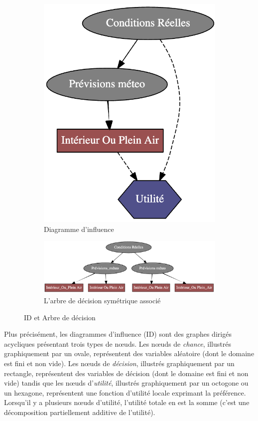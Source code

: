 \documentclass[12pt]{article}
\begin{document}
\begin{figure}[h]
\centering
\begin{subfigure}{.5\textwidth}
  \centering
  \includegraphics[width=.5\linewidth]{docs/ressources_rapport/exempleID_SIMPLE.png}
  \caption{Diagramme d'influence}
  \label{fig:sub1}
\end{subfigure}%
\begin{subfigure}{.5\textwidth}
  \centering
  \includegraphics[width=1.2\linewidth]{docs/ressources_rapport/exempleArbreDecision.png}
  \caption{L'arbre de décision symétrique associé}
  \label{fig:sub2}
\end{subfigure}
\caption{ID et Arbre de décision}
\label{fig:test}
\end{figure}

Plus précisément, les diagrammes d'influence (ID) sont des graphes dirigés acycliques présentant trois types de nœuds. Les nœuds de \textit{chance}, illustrés graphiquement par un ovale, représentent des variables aléatoire (dont le domaine est fini et non vide). 
Les nœuds de \textit{décision}, illustrés graphiquement par un rectangle, représentent des variables de décision (dont le domaine est fini et non vide) tandis que les nœuds d'\textit{utilité}, illustrés graphiquement par un octogone ou un hexagone, représentent une fonction d'utilité locale exprimant la préférence.
Lorsqu'il y a plusieurs nœuds d'utilité, l'utilité totale en est la somme (c'est une décomposition partiellement additive de l'utilité).
\end{document}
